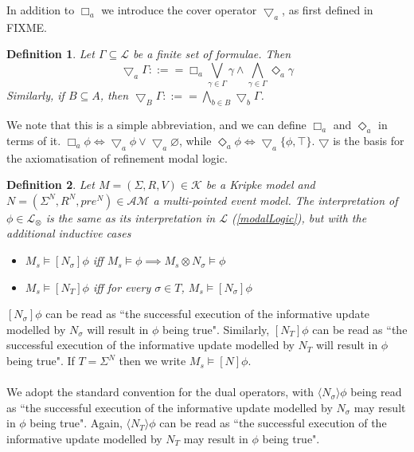 \documentclass[12pt, a4paper, titlepage]{scrartcl}
\newtheorem{defn}{Definition}[subsection]
\numberwithin{equation}{section}
\newcommand{\cover}{\bigtriangledown}
\newcommand{\sqex}[1]{[{#1}]}
\newcommand{\anex}[1]{\langle {#1} \rangle}
\newcommand{\lang}{\mathcal{L}}
\newcommand{\langActEx}{\lang_{\otimes}}
\newcommand{\kripkeClass}{\mathcal{K}}
\newcommand{\eventClass}{\mathcal{AM}}
\newcommand{\FIXME}{{\bf FIXME}}
\begin{document}
In addition to $\Box_a$ we introduce the cover operator $\cover_a$, as first defined in \\FIXME.
\begin{defn} \label{coverDef}
Let $\Gamma \subseteq \lang$ be a finite set of formulae.
Then
\[
  \cover_a \Gamma ::== \Box_a \bigvee_{\gamma \in \Gamma} \gamma \land
  \bigwedge_{\gamma \in \Gamma} \Diamond_a \gamma
\]
Similarly, if $B \subseteq A$, then $\cover_B \Gamma ::== \bigwedge_{b \in B}
\cover_b \Gamma$.
\end{defn}
We note that this is a simple abbreviation, and we can define $\Box_a$ and
$\Diamond_a$ in terms of it.
$\Box_a \phi \iff \cover_a \phi \lor \cover_a \varnothing$, while $\Diamond_a
\phi \iff \cover_a \{\phi, \top\}$.
$\cover$ is the basis for the axiomatisation of refinement modal logic.

\begin{defn} \label{actModelLogic}
Let $M = (\Sigma, R, V) \in \kripkeClass$ be a Kripke model and $N = (\Sigma^N, R^N, pre^N) \in
\eventClass$ a multi-pointed event model.
The interpretation of $\phi \in \langActEx$ is the same as its interpretation in $\lang$
(\ref{modalLogic}), but with the additional
inductive cases
\begin{itemize}
	\item $M_s \models \sqex{N_\sigma} \phi$ iff $M_s \models \phi \implies M_s \otimes N_\sigma \models
	\phi$
	\item $M_s \models \sqex{N_T} \phi$ iff for every $\sigma \in T$, $M_s \models \sqex{N_\sigma} \phi$ 
\end{itemize}
\end{defn}
$\sqex{N_\sigma} \phi$ can be read as ``the successful execution of the informative update modelled by
$N_\sigma$ will result in $\phi$ being true".
Similarly, $\sqex{N_T} \phi$ can be read as ``the successful execution of the informative update
modelled by $N_T$ will result in $\phi$ being true".
If $T = \Sigma^N$ then we write $M_s \models \sqex{N} \phi$.\\
\\
We adopt the standard convention for the dual operators, with $\anex{ N_\sigma } \phi$ being
read as ``the successful execution of the informative update modelled by $N_\sigma$ may result in
$\phi$ being true".
Again, $\anex{ N_T } \phi$ can be read as ``the successful execution of the informative
update modelled by $N_T$ may result in $\phi$ being true".

\end{document}
